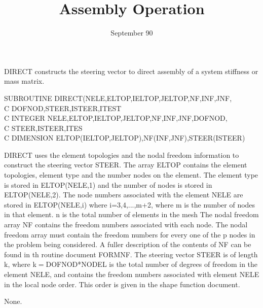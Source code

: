 \date{September 90}
\title{Assembly Operation}

\begin{purpose}
DIRECT constructs the steering vector to direct assembly
of a system stiffness or mass matrix.
\end{purpose}
\begin{specification}
      SUBROUTINE DIRECT(NELE,ELTOP,IELTOP,JELTOP,NF,INF,JNF,\\
C           DOFNOD,STEER,ISTEER,ITEST\\
C     INTEGER NELE,ELTOP,IELTOP,JELTOP,NF,INF,JNF,DOFNOD,\\
C           STEER,ISTEER,ITES\\
C     DIMENSION ELTOP(IELTOP,JELTOP),NF(INF,JNF),STEER(ISTEER)\\
\end{specification}
\begin{description}
DIRECT uses the element topologies and the nodal freedom
information to construct the steering vector STEER.
The array ELTOP contains the element topologies, element
type and the number nodes on the element. The element type
is stored in ELTOP(NELE,1) and the number of nodes is stored
in ELTOP(NELE,2). The node numbers associated with the element
NELE are stored in ELTOP(NELE,i) where i=3,4,...,m+2, where
m is the number of nodes in that element. n is the total number of elements
in the mesh
The nodal freedom array NF contains the freedom numbers
associated with each node. The nodal freedom array must
contain the freedom numbers for every one of the p nodes
in the problem being considered. A fuller description
of the contents of NF can be found in th routine
document FORMNF.
The steering vector STEER is of length k, where k$=$DOFNOD*NODEL
is the total number of degrees of freedom in the element
NELE, and contains the freedom numbers associated with
element NELE in the local node order. This order is given
in the shape function document.
\end{description}
\begin{references}
None.
\end{references}
